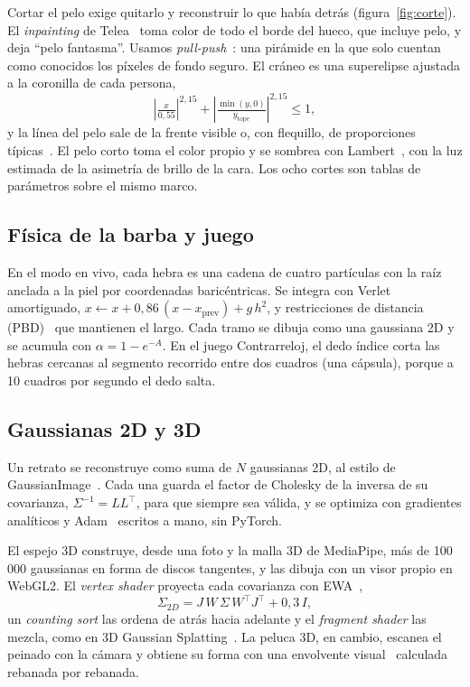 \documentclass[10pt,a4paper,twocolumn]{article}
\begin{document}
Cortar el pelo exige quitarlo y reconstruir lo que había detrás (figura~\ref{fig:corte}). El \emph{inpainting} de Telea~\cite{telea2004} toma color de todo el borde del hueco, que incluye pelo, y deja ``pelo fantasma''. Usamos \emph{pull-push}~\cite{gortler1996}: una pirámide en la que solo cuentan como conocidos los píxeles de fondo seguro. El cráneo es una superelipse ajustada a la coronilla de cada persona,
\begin{equation}
  \left|\tfrac{x}{0{,}55}\right|^{2{,}15}+\left|\tfrac{\min(y,0)}{y_{\text{tope}}}\right|^{2{,}15}\le 1,
\end{equation}
y la línea del pelo sale de la frente visible o, con flequillo, de proporciones típicas~\cite{farkas1994}. El pelo corto toma el color propio y se sombrea con Lambert~\cite{marschner2016}, con la luz estimada de la asimetría de brillo de la cara. Los ocho cortes son tablas de parámetros sobre el mismo marco.

\subsection{Física de la barba y juego}

En el modo en vivo, cada hebra es una cadena de cuatro partículas con la raíz anclada a la piel por coordenadas baricéntricas. Se integra con Verlet~\cite{verlet1967} amortiguado, $x\leftarrow x+0{,}86\,(x-x_{\text{prev}})+g\,h^2$, y restricciones de distancia (PBD)~\cite{jakobsen2001,muller2007} que mantienen el largo. Cada tramo se dibuja como una gaussiana 2D y se acumula con $\alpha=1-e^{-A}$. En el juego Contrarreloj, el dedo índice corta las hebras cercanas al segmento recorrido entre dos cuadros (una cápsula), porque a 10 cuadros por segundo el dedo salta.

\subsection{Gaussianas 2D y 3D}

Un retrato se reconstruye como suma de $N$ gaussianas 2D, al estilo de GaussianImage~\cite{zhang2024}. Cada una guarda el factor de Cholesky de la inversa de su covarianza, $\Sigma^{-1}=LL^\top$, para que siempre sea válida, y se optimiza con gradientes analíticos y Adam~\cite{kingma2015} escritos a mano, sin PyTorch.

El espejo 3D construye, desde una foto y la malla 3D de MediaPipe, más de 100\,000 gaussianas en forma de discos tangentes, y las dibuja con un visor propio en WebGL2. El \emph{vertex shader} proyecta cada covarianza con EWA~\cite{zwicker2001},
\begin{equation}
  \Sigma_{2D}=J\,W\,\Sigma\,W^\top J^\top+0{,}3\,I,
\end{equation}
un \emph{counting sort} las ordena de atrás hacia adelante y el \emph{fragment shader} las mezcla, como en 3D Gaussian Splatting~\cite{kerbl2023}. La peluca 3D, en cambio, escanea el peinado con la cámara y obtiene su forma con una envolvente visual~\cite{laurentini1994} calculada rebanada por rebanada.
\end{document}

